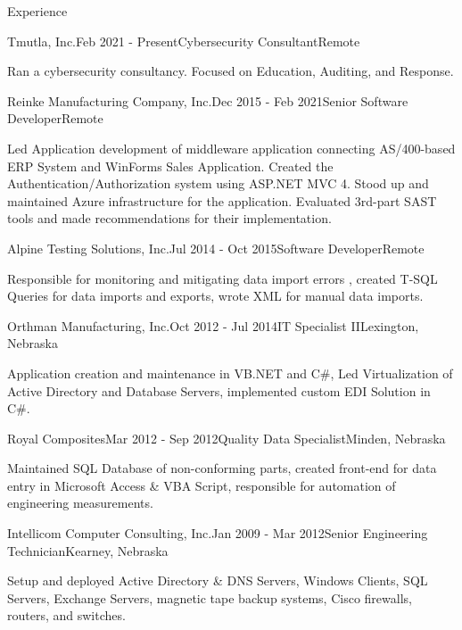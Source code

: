 \documentclass{resume} %
\begin{document}

\begin{rSection}{Experience}

\begin{rSubsection}{Tmutla, Inc.}{Feb 2021 - Present}{Cybersecurity Consultant}{Remote}
\item Ran a cybersecurity consultancy. Focused on Education, Auditing, and Response.
\end{rSubsection}

\begin{rSubsection}{Reinke Manufacturing Company, Inc.}{Dec 2015 - Feb 2021}{Senior Software Developer}{Remote} 
\item Led Application development of middleware application connecting AS/400-based ERP System and WinForms Sales Application. Created the Authentication/Authorization system using ASP.NET MVC 4. Stood up and maintained Azure infrastructure for the application. Evaluated 3rd-part SAST tools and made recommendations for their implementation.
\end{rSubsection}

\begin{rSubsection}{Alpine Testing Solutions, Inc.}{Jul 2014 - Oct 2015}{Software Developer}{Remote}
\item Responsible for monitoring and mitigating data import errors , created T-SQL Queries for data imports and exports, wrote XML for manual data imports.
\end{rSubsection}

\begin{rSubsection}{Orthman Manufacturing, Inc.}{Oct 2012 - Jul 2014}{IT Specialist II}{Lexington, Nebraska}
\item Application creation and maintenance in VB.NET and C\#, Led Virtualization of Active Directory and Database Servers, implemented custom EDI Solution in C\#.
\end{rSubsection}

\begin{rSubsection}{Royal Composites}{Mar 2012 - Sep 2012}{Quality Data Specialist}{Minden, Nebraska}
\item Maintained SQL Database of non-conforming parts, created front-end for data entry in Microsoft Access \& VBA Script, responsible for automation of engineering measurements.
\end{rSubsection}

\begin{rSubsection}{Intellicom Computer Consulting, Inc.}{Jan 2009 - Mar 2012}{Senior Engineering Technician}{Kearney, Nebraska}
\item Setup and deployed Active Directory \& DNS Servers, Windows Clients, SQL Servers, Exchange Servers, magnetic tape backup systems,  Cisco firewalls, routers, and switches.
\end{rSubsection}

\end{rSection}
\end{document}
